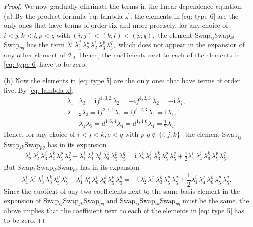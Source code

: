 \documentclass[12pt,dvipsnames,accepted=2016-08-18,a4paper,onecolumn]{quantumarticle}
\numberwithin{equation}{section}
\theoremstyle{definition}
\begin{document}
\begin{proof}
We now gradually eliminate the terms in the linear dependence equation:
(a) By the product formula \eqref{eq: lambda x}, the elements in \eqref{eq: type 6} are the only ones that have terms of order six and more precisely, for any choice of $i < j, k < l, p < q$ with $(i,j) < (k,l) < (p,q),$ the element Swap$_{ij}$Swap$_{kl}$Swap$_{pq}$ has the term $\lambda_1^i\, \lambda_1^j\, \lambda_2^k\, \lambda_2^l\, \lambda_3^p\, \lambda_3^q,$
which does not appear in the expansion of any other element of $\mathcal{B}_3.$ Hence, the coefficients next to each of the elements in \eqref{eq: type 6} have to be zero. 

(b) Now the elements in \eqref{eq: type 5} are the only ones that have terms of order five.
By \eqref{eq: lambda x},
\begin{align*}
\lambda_1& \lambda_3 =  \mathfrak{i}f^{1,3,2}\,\lambda_2 = -\mathfrak{i}f^{1,2,3}\,\lambda_2 = -\mathfrak{i}\,\lambda_2, \\
\lambda&_2\lambda_3 = \mathfrak{i}f^{2,3,1}\lambda_1 = \mathfrak{i}f^{1,2,3}\,\lambda_1 = \mathfrak{i}\,\lambda_1,\\
&\lambda_1 \lambda_6  = d^{1,6,4}\lambda_4 = d^{1,4,6}\lambda_4 = \frac{1}{2} \lambda_4.
\end{align*}
 Hence, for any choice of $i < j < k,  p<q$ with $p,q \notin \{i,j,k\},$ the element Swap$_{ij}$Swap$_{jk}$Swap$_{pq}$ has in its expansion
 \begin{align*}
\lambda_2^i\, \lambda_2^j\, \lambda_3^j\, \lambda_3^k\, \lambda_5^p\, \lambda_5^q + \lambda_1^i\, \lambda_1^j\, \lambda_6^j\, \lambda_6^k\, \lambda_5^p\, \lambda_5^q =
\mathfrak{i}\,\lambda_2^i\, \lambda_1^j\, \lambda_3^k\, \lambda_5^p\, \lambda_5^q + \frac{1}{2} \lambda_1^i\, \lambda_4^j\, \lambda_6^k\, \lambda_5^p\, \lambda_5^q.
 \end{align*}
 But Swap$_{ij}$Swap$_{ik}$Swap$_{pq}$ has in its expansion
 $$
 \lambda_1^i\, \lambda_1^j\, \lambda_3^i\, \lambda_3^k\, \lambda_5^p\, \lambda_5^q + \lambda_1^i\, \lambda_1^j\, \lambda_6^i\, \lambda_6^k\, \lambda_5^p\, \lambda_5^q =
 -\mathfrak{i}\,\lambda_2^i\, \lambda_1^j\, \lambda_3^k\, \lambda_5^p\, \lambda_5^q + \frac{1}{2} \lambda_1^i\, \lambda_4^j\, \lambda_6^k\, \lambda_5^p\, \lambda_5^q.
 $$
 Since the quotient of any two coefficients next to the same basis element in the expansion of Swap$_{ij}$Swap$_{jk}$Swap$_{pq}$ and Swap$_{ij}$Swap$_{ik}$Swap$_{pq}$ must be the same,
 the above implies that the coefficient next to each of the elements in \eqref{eq: type 5}
has to be zero.


\end{proof}
\end{document}
